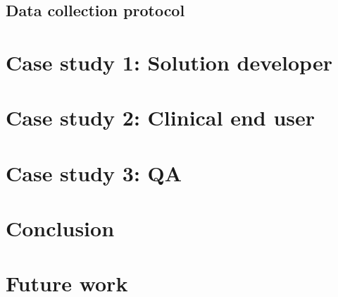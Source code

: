 \documentclass[a4paper,5p,review]{elsarticle}
\begin{document}


\subsection{Data collection protocol}



\section{Case study 1: Solution developer}

\section{Case study 2: Clinical end user}

\section{Case study 3: QA}

\section{Conclusion}
\label{sec:Conclusion}

\section{Future work}
\label{sec:FutureWork}
\end{document}
